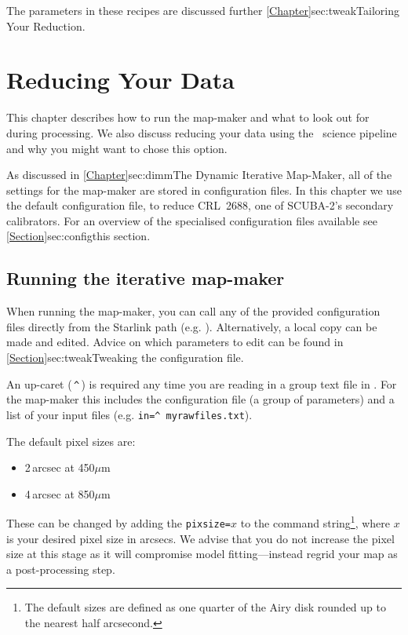 \documentclass[11pt,oneside,chapters]{starlink}
\begin{document}
The parameters in these recipes are discussed further
\cref{Chapter}{sec:tweak}{Tailoring Your Reduction}.



\chapter{Reducing Your Data}
\label{sec:maps}

This chapter describes how to run the map-maker and what to look out
for during processing. We also discuss reducing your data using the
\oracdr\ science pipeline and why you might want to chose this option.

As discussed in \cref{Chapter}{sec:dimm}{The
Dynamic Iterative Map-Maker}, all of the settings for the map-maker
are stored in configuration files. In this chapter we use
the default configuration file,  to reduce CRL~2688,
one of SCUBA-2's secondary calibrators. For an
overview of the specialised configuration files available see
\cref{Section}{sec:config}{this section}.

\section{Running the iterative map-maker}
\label{sec:running}

When running the map-maker, you can call any of the provided
configuration files directly from the Starlink path (e.g.
). Alternatively,
a local copy can be made and edited. Advice on which parameters to
edit can be found in \cref{Section}{sec:tweak}{Tweaking the
configuration file}.

\begin{tip}
An up-caret (\,\texttt{\^{}}\,) is required any time you are reading in
a  group text file in \starlink. For the map-maker this includes the
configuration file (a group of parameters) and a list of your input files
(e.g. \texttt{in=\^{}\,myrawfiles.txt}).
\end{tip}


The default pixel sizes are:
\begin{itemize}
\item 2\,arcsec at 450$\mu$m
\item 4\,arcsec at 850$\mu$m
\end{itemize}

These can be changed by adding the \texttt{pixsize=}$x$ to the
command string\footnote{The default sizes are defined as one quarter
of the Airy disk rounded up to the nearest half arcsecond.}, where $x$
is your desired pixel size in arcsecs. We advise that you do not
increase the pixel size at this stage as it will compromise model
fitting---instead regrid your map as a post-processing step.
\end{document}
